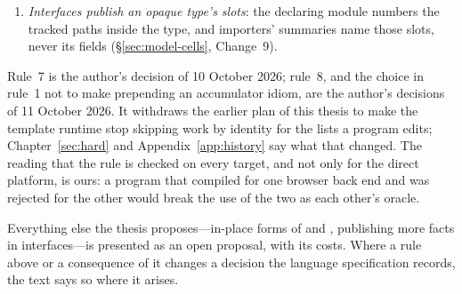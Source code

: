 \begin{enumerate}
(\S\ref{sec:hard-tea}, ). The template runtime keeps today's persistent lists and every
identity-based skip it has; so does every other target. The ownership rule itself is a rule of the
language, checked on every build whatever the target, so that one source has one verdict and one
meaning on both browser back ends, which are compiled from the same source and used as each other's
test oracle. On a target that keeps persistent lists an accepted program means what it meant before,
and the rule changes nothing but which programs are accepted.
\item \emph{Interfaces publish an opaque type's slots}: the declaring module numbers the tracked paths
inside the type, and importers' summaries name those slots, never its fields (\S\ref{sec:model-cells},
Change~9).
\end{enumerate}
Rule~7 is the author's decision of 10 October 2026; rule~8, and the choice in rule~1 not to make
prepending an accumulator idiom, are the author's decisions of 11 October 2026. It withdraws the earlier plan of this thesis to make
the template runtime stop skipping work by identity for the lists a program edits; Chapter~\ref{sec:hard}
and Appendix~\ref{app:history} say what that changed. The reading that the rule is checked on every
target, and not only for the direct platform, is ours: a program that compiled for one browser back end
and was rejected for the other would break the use of the two as each other's oracle.

Everything else the thesis proposes---in-place forms of  and
, publishing more facts in interfaces---is presented as an open proposal, with its costs.
Where a rule above or a consequence of it changes a decision the language specification records, the
text says so where it arises.
